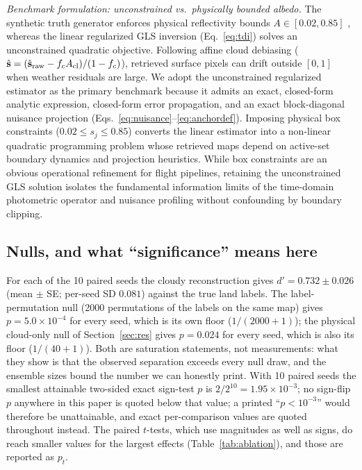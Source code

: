 \documentclass[twocolumn,10pt]{article}
\begin{document}
\emph{Benchmark formulation: unconstrained vs.\ physically bounded albedo.}
The synthetic truth generator enforces physical reflectivity bounds $A\in[0.02, 0.85]$
\citep{tt20psf}, whereas the linear regularized GLS inversion (Eq.~\ref{eq:tdi}) solves
an unconstrained quadratic objective. Following affine cloud debiasing
($\hat{\mathbf{s}} = (\hat{\mathbf{s}}_{\rm raw} - f_c A_{\rm cl})/(1-f_c)$), retrieved
surface pixels can drift outside $[0, 1]$ when weather residuals are large. We adopt the
unconstrained regularized estimator as the primary benchmark because it admits an exact,
closed-form analytic expression, closed-form error propagation, and an exact block-diagonal
nuisance projection (Eqs.~\ref{eq:nuisance}--\ref{eq:anchordef}). Imposing physical box
constraints ($0.02 \le s_j \le 0.85$) converts the linear estimator into a non-linear
quadratic programming problem whose retrieved maps depend on active-set boundary dynamics
and projection heuristics. While box constraints are an obvious operational refinement for
flight pipelines, retaining the unconstrained GLS solution isolates the fundamental
information limits of the time-domain photometric operator and nuisance profiling without
confounding by boundary clipping.

\subsection{Nulls, and what ``significance'' means here}
\label{sec:nulls}
For each of the 10 paired seeds the cloudy reconstruction gives
$d'=0.732\pm0.026$ (mean $\pm$ SE; per-seed SD $0.081$) against the true land
labels. The label-permutation null
(2000 permutations of the labels on the same map) gives $p=5.0\times10^{-4}$
for every seed, which is its own floor ($1/(2000+1)$); the physical cloud-only
null of Section~\ref{sec:res} gives $p=0.024$ for every seed, which is also its
floor ($1/(40+1)$). Both are saturation statements, not measurements: what they
show is that the observed separation exceeds every null draw, and the ensemble
sizes bound the number we can honestly print. With 10 paired seeds the smallest
attainable two-sided exact sign-test $p$ is $2/2^{10}=1.95\times10^{-3}$; no
sign-flip $p$ anywhere in this paper is quoted below that value; a printed
``$p<10^{-3}$'' would therefore be unattainable, and exact per-comparison
values are quoted throughout instead.
The paired $t$-tests, which use magnitudes as well as signs, do reach smaller
values for the largest effects (Table~\ref{tab:ablation}), and those are
reported as $p_t$.
\end{document}
